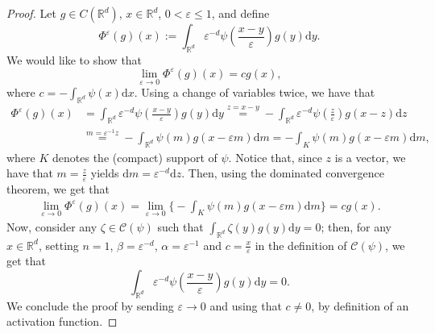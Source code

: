 \documentclass[11pt,a4paper,reqno]{amsart}
\numberwithin{equation}{section}
\theoremstyle{plain}
\theoremstyle{definition}
\def\e{{\varepsilon}}
\def\ud{\mathrm d}
\newcommand{\R}{\mathbb{R}}
\begin{document}
\begin{proof}
Let $g \in C (\R^d)$, $x \in \R^d$, $0 < \e \leq 1$, and define 
\[
\Phi^\e \left( g \right) (x) := \int_{\R^d} \e^{-d} \psi \left( \frac{x - y}{\e} \right) g \left( y \right) \ud y.
\]
We would like to show that 
\[
 \lim_{\e \to 0} \Phi^\e \left( g \right) (x) = cg (x),
\]
where $c = - \int_{\R^d} \psi (x) \ud x$. 
Using a change of variables twice, we have that 
\begin{align*}
\Phi^\e \left( g \right) (x) 
    &= \int_{\R^d} \e^{- d} \psi \left( \frac{x - y}{\e} \right) g \left( y \right) \ud y 
    \stackrel{z = x - y}{=} - \int_{\R^d} \e^{- d}\psi \left( \frac{z}{\e} \right) g \left( x - z \right) \ud z \\ 
    &\stackrel{m = \e^{-1}z}{=} - \int_{\R^d} \psi \left( m \right) g \left( x - \e m \right) \ud m 
    = - \int_K \psi \left( m \right) g \left( x - \e m \right) \ud m,
\end{align*}
where $K$ denotes the (compact) support of $\psi$. 
Notice that, since $z$ is a vector, we have that $m=\frac{z}{\e}$ yields $\ud m = \e^{-d}\ud z$.
Then, using the dominated convergence theorem, we get that
\begin{align*}
\lim_{\e \to 0} \Phi^\e \left( g \right) (x) 
    = \lim_{\e \to 0} \Big\{ - \int_K \psi \left( m \right) g \left( x - \e m \right) \ud m \Big\} = cg (x).
\end{align*}
Now, consider any $\zeta \in \mathcal{C} \left(\psi\right)$ such that $\int_{\R^d} \zeta (y) g (y) \ud y = 0$; then, for any $x \in \R^d$, setting $n=1$, $\beta=\e^{-d}$, $\alpha = \e^{-1}$ and $c = \frac{x}{\e}$ in the definition of $\mathcal{C} \left(\psi\right)$, we get that
\[
 \int_{\R^d} \e^{- d} \psi \left( \frac{x - y}{\e} \right) g \left( y \right) \ud y = 0.
\]
We conclude the proof by sending $\e \to 0$ and using that $c \ne 0$, by definition of an activation function.
\end{proof}

\end{document}
